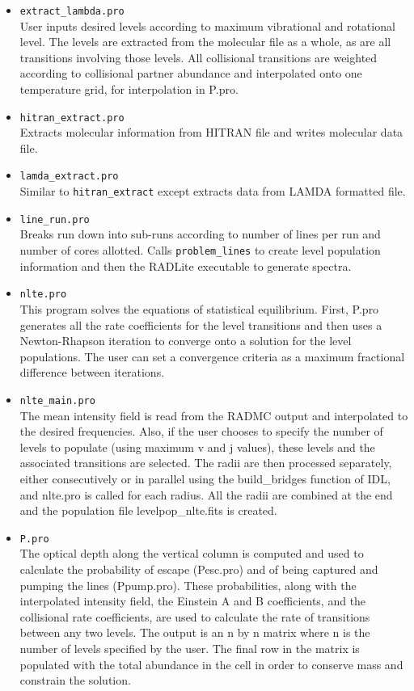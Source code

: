 \documentclass[11pt]{article}
\begin{document}
\begin{itemize}

\item{\tt extract\_lambda.pro}\\
User inputs desired levels according to maximum vibrational and rotational level.  The levels are extracted from the molecular file as a whole, as are all transitions involving those levels.  All collisional transitions are weighted according to collisional partner abundance and interpolated onto one temperature grid, for interpolation in P.pro.

\item {\tt hitran\_extract.pro}\\
Extracts molecular information from HITRAN file and writes molecular data file.

\item {\tt lamda\_extract.pro}\\
Similar to {\tt hitran\_extract} except extracts data from LAMDA formatted file.

\item {\tt line\_run.pro}\\
Breaks run down into sub-runs according to number of lines per run and number of cores allotted.  Calls {\tt problem\_lines} to create level population information and then the RADLite executable to generate spectra.

\item{\tt nlte.pro}\\
This program solves the equations of statistical equilibrium.  First, P.pro generates all the rate coefficients for the level transitions and then uses a Newton-Rhapson iteration to converge onto a solution for the level populations.  The user can set a convergence criteria as a maximum fractional difference between iterations.  

\item{\tt nlte\_main.pro}\\
The mean intensity field is read from the RADMC output and interpolated to the desired frequencies.  Also, if the user chooses to specify the number of levels to populate (using maximum v and j values), these levels and the associated transitions are selected.  The radii are then processed separately, either consecutively or in parallel using the build\_bridges function of IDL, and nlte.pro is called for each radius.  All the radii are combined at the end and the population file levelpop\_nlte.fits is created.

\item{\tt P.pro}\\
The optical depth along the vertical column is computed and used to calculate the probability of escape (Pesc.pro) and of being captured and pumping the lines (Ppump.pro).  These probabilities, along with the interpolated intensity field, the Einstein A and B coefficients, and the collisional rate coefficients, are used to calculate the rate of transitions between any two levels.  The output is an n by n matrix where n is the number of levels specified by the user.  The final row in the matrix is populated with the total abundance in the cell in order to conserve mass and constrain the solution.


\end{itemize}
\end{document}
